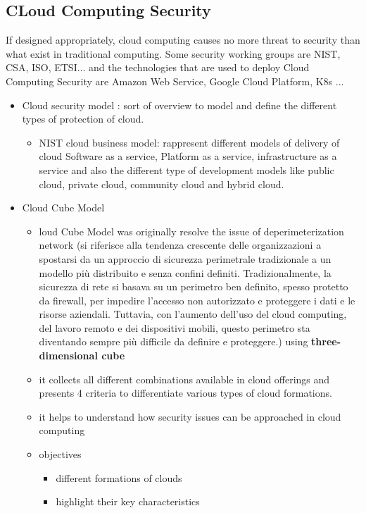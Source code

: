 \documentclass{article}
\begin{document}
\subsection{CLoud Computing Security}
If designed appropriately, cloud computing causes no more threat to security than what exist in traditional computing. Some security working groups are NIST, CSA, ISO, ETSI... and the technologies that are used to deploy Cloud Computing Security are Amazon Web Service, Google Cloud Platform, K8s ... 
\begin{itemize}
    \item Cloud security model : sort of overview to model and define the different types of protection of cloud.
    \begin{itemize}
        \item NIST cloud business model: rappresent different models of delivery of cloud Software as a service, Platform as a service, infrastructure as a service and also the different type of development models like public cloud, private cloud, community cloud and hybrid cloud.
    \end{itemize}
    \item Cloud Cube Model
    \begin{itemize}
        \item loud Cube Model was originally resolve the issue of deperimeterization network (si riferisce alla tendenza crescente delle organizzazioni a spostarsi da un approccio di sicurezza perimetrale tradizionale a un modello più distribuito e senza confini definiti. Tradizionalmente, la sicurezza di rete si basava su un perimetro ben definito, spesso protetto da firewall, per impedire l'accesso non autorizzato e proteggere i dati e le risorse aziendali. Tuttavia, con l'aumento dell'uso del cloud computing, del lavoro remoto e dei dispositivi mobili, questo perimetro sta diventando sempre più difficile da definire e proteggere.) using \textbf{three-dimensional cube}
        \item it collects all different combinations available in cloud offerings and presents 4 criteria to differentiate various types of cloud formations.
        \item it helps to understand  how security issues can be approached in cloud computing
        \item objectives
        \begin{itemize}
            \item different formations of clouds
            \item highlight their key characteristics

\end{itemize}
\end{itemize}
\end{itemize}
\end{document}
